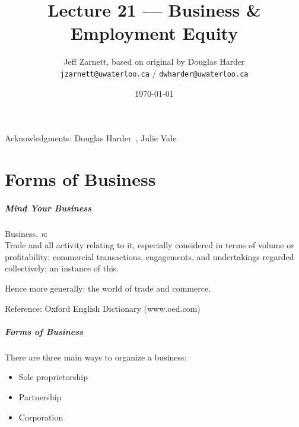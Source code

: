 

\title{Lecture 21 --- Business \& Employment Equity }

\author{Jeff Zarnett, based on original by Douglas Harder \\ \small \texttt{jzarnett@uwaterloo.ca} / \texttt{dwharder@uwaterloo.ca}}
\date{\today}




\begin{frame}
  \titlepage

\begin{center}
  \small{Acknowledgments: Douglas Harder~\cite{dwh}, Julie Vale~\cite{jv}}
  \end{center}
\end{frame}

\part{Forms of Business}

\begin{frame}
\partpage
\end{frame}



\begin{frame}
\frametitle{Mind Your Business}

Business, \textit{n}:\\
\quad Trade and all activity relating to it, especially considered in terms of volume or profitability; commercial transactions, engagements, and undertakings regarded collectively; an instance of this.

Hence more generally: the world of trade and commerce.

Reference:  Oxford English Dictionary (www.oed.com)

\end{frame}



\begin{frame}
\frametitle{Forms of Business}

There are three main ways to organize a business:

\begin{itemize}
	\item Sole proprietorship
	\item Partnership
	\item Corporation
\end{itemize}

\end{frame}



